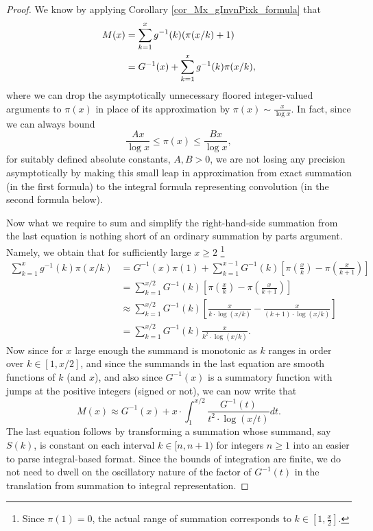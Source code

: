 \documentclass[11pt,reqno,a4letter]{article}
\numberwithin{figure}{section}
\numberwithin{table}{section}
\theoremstyle{plain}
\numberwithin{theorem}{section}
\theoremstyle{definition}
\begin{document}
\begin{proof} 
We know by applying Corollary \ref{cor_Mx_gInvnPixk_formula} that 
\begin{align} 
\notag
M(x) & = \sum_{k=1}^{x} g^{-1}(k) (\pi(x/k)+1) \\ 
\notag
     & = G^{-1}(x) + \sum_{k=1}^{x} g^{-1}(k) \pi(x/k), 
\end{align} 
where we can drop the asymptotically unnecessary floored integer-valued arguments to $\pi(x)$ in place of 
its approximation by $\pi(x) \sim \frac{x}{\log x}$. In fact, since we can always 
bound $$\frac{Ax}{\log x} \leq \pi(x) \leq \frac{Bx}{\log x},$$ for suitably defined 
absolute constants, $A,B > 0$, we are not losing any precision asymptotically by making 
this small leap in approximation from exact summation (in the first formula) to the 
integral formula representing convolution (in the second formula below). 

Now what we require to sum and simplify the right-hand-side summation from the last equation is 
nothing short of an ordinary summation by parts argument. Namely, we obtain that for sufficiently large 
$x \geq 2$ \footnote{
     Since $\pi(1) = 0$, the actual range of summation corresponds to 
     $k \in \left[1, \frac{x}{2}\right]$. 
}
\begin{align*} 
\sum_{k=1}^{x} g^{-1}(k) \pi(x/k) & = G^{-1}(x) \pi(1) + \sum_{k=1}^{x-1} G^{-1}(k) \left[ 
     \pi\left(\frac{x}{k}\right) - \pi\left(\frac{x}{k+1}\right)\right] \\ 
     & = \sum_{k=1}^{x/2} G^{-1}(k) \left[ 
     \pi\left(\frac{x}{k}\right) - \pi\left(\frac{x}{k+1}\right)\right] \\ 
     & \approx \sum_{k=1}^{x/2} G^{-1}(k) \left[ 
     \frac{x}{k \cdot \log(x/k)} - \frac{x}{(k+1) \cdot \log(x/k)}\right] \\ 
     & = \sum_{k=1}^{x/2} G^{-1}(k) \frac{x}{k^2 \cdot \log(x/k)}. 
\end{align*} 
Now since for $x$ large enough the summand is monotonic as $k$ ranges in order over $k \in [1, x/2]$, and 
since the summands in the last equation are smooth functions of $k$ (and $x$), and also since $G^{-1}(x)$ is 
a summatory function with jumps at the positive integers (signed or not), we can now write that 
\[
M(x) \approx G^{-1}(x) + x \cdot \int_1^{x/2} \frac{G^{-1}(t)}{t^2 \cdot \log(x/t)} dt. 
\]
The last equation follows by transforming a summation whose summand, say $S(k)$, is constant on each 
interval $k \in [n, n+1)$ for integers $n \geq 1$ into an easier to parse integral-based format. 
Since the bounds of integration are finite, we do not need to dwell on the oscillatory nature of the 
factor of $G^{-1}(t)$ in the translation from summation to integral representation. 
\end{proof} 
\end{document}
